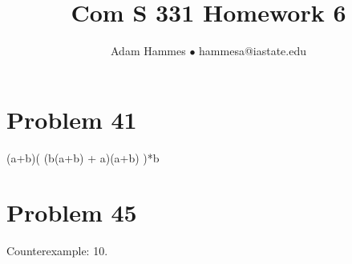 \documentclass[11pt]{article}
\begin{document}
\title{Com S 331 Homework 6}
\author{Adam Hammes $\bullet$ hammesa@iastate.edu}
\maketitle

\section*{Problem 41}

(a+b)( (b(a+b) + a)(a+b) )*b

\section*{Problem 45}

Counterexample: 10.
\end{document}
